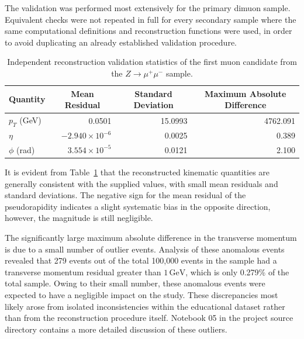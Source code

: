 \documentclass[11pt, a4paper]{article}
\numberwithin{equation}{section}
\begin{document}
The validation was performed most extensively for the primary dimuon sample. Equivalent checks were not repeated in full for every secondary sample where the same computational definitions and reconstruction functions were used, in order to avoid duplicating an already established validation procedure.

\begin{table}[htbp]
    \begin{center}
    \begin{threeparttable}
        \caption{Independent reconstruction validation statistics of the first muon candidate from the $Z \rightarrow \mu^+ \mu^-$ sample.}
        \label{tab:validation_statistics}   
            \begin{tabular}{ | l | r | r | r | }
                \hline
                \multicolumn{1}{|c|}{\textbf{Quantity}} & \multicolumn{1}{|c|}{\textbf{Mean Residual}} & \multicolumn{1}{|c|}{\textbf{Standard Deviation}} & \multicolumn{1}{|c|}{\textbf{Maximum Absolute Difference}} \\ \hline
                $p_T$ (GeV) & 0.0501 & 15.0993 & 4762.091\\
                $\eta$ & $-2.940 \times 10^{-6}$ & 0.0025 & 0.389 \\
                $\phi$ (rad) & $3.554 \times 10^{-5}$ & 0.0121 & 2.100\\
                \hline
        \end{tabular}
    \end{threeparttable}
    \end{center}
\end{table}

It is evident from Table~\ref{tab:validation_statistics} that the reconstructed kinematic quantities are generally consistent with the supplied values, with small mean residuals and standard deviations. The negative sign for the mean residual of the pseudorapidity indicates a slight systematic bias in the opposite direction, however, the magnitude is still negligible.

The significantly large maximum absolute difference in the transverse momentum is due to a small number of outlier events. Analysis of these anomalous events revealed that 279 events out of the total 100,000 events in the sample had a transverse momentum residual greater than $1 \, \text{GeV}$, which is only 0.279\% of the total sample. Owing to their small number, these anomalous events were expected to have a negligible impact on the study. These discrepancies most likely arose from isolated inconsistencies within the educational dataset rather than from the reconstruction procedure itself. Notebook 05 in the project source directory contains a more detailed discussion of these outliers.
\end{document}
